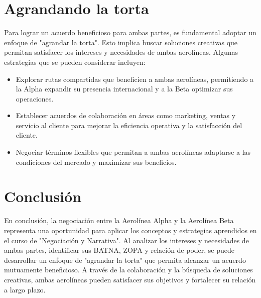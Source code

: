 \section{Agrandando la torta}
Para lograr un acuerdo beneficioso para ambas partes, es fundamental adoptar un enfoque de "agrandar la torta". Esto implica buscar soluciones creativas que permitan satisfacer los intereses y necesidades de ambas aerolíneas. Algunas estrategias que se pueden considerar incluyen:
\begin{itemize}
    \item Explorar rutas compartidas que beneficien a ambas aerolíneas, permitiendo a la Alpha expandir su presencia internacional y a la Beta optimizar sus operaciones.
    \item Establecer acuerdos de colaboración en áreas como marketing, ventas y servicio al cliente para mejorar la eficiencia operativa y la satisfacción del cliente.
    \item Negociar términos flexibles que permitan a ambas aerolíneas adaptarse a las condiciones del mercado y maximizar sus beneficios.
\end{itemize}

\section{Conclusión}
En conclusión, la negociación entre la Aerolínea Alpha y la Aerolínea Beta representa una oportunidad para aplicar los conceptos y estrategias aprendidos en el curso de "Negociación y Narrativa". Al analizar los intereses y necesidades de ambas partes, identificar sus BATNA, ZOPA y relación de poder, se puede desarrollar un enfoque de "agrandar la torta" que permita alcanzar un acuerdo mutuamente beneficioso. A través de la colaboración y la búsqueda de soluciones creativas, ambas aerolíneas pueden satisfacer sus objetivos y fortalecer su relación a largo plazo.